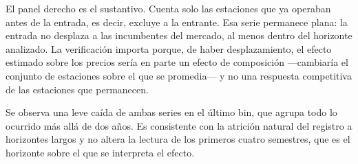 El panel derecho es el sustantivo. Cuenta solo las estaciones que ya operaban
antes de la entrada, es decir, excluye a la entrante. Esa serie permanece plana:
la entrada no desplaza a las incumbentes del mercado, al menos dentro del
horizonte analizado. La verificación importa porque, de haber desplazamiento, el
efecto estimado sobre los precios sería en parte un efecto de composición
—cambiaría el conjunto de estaciones sobre el que se promedia— y no una
respuesta competitiva de las estaciones que permanecen.

Se observa una leve caída de ambas series en el último bin, que agrupa todo lo
ocurrido más allá de dos años. Es consistente con la atrición natural del
registro a horizontes largos y no altera la lectura de los primeros cuatro
semestres, que es el horizonte sobre el que se interpreta el efecto.
